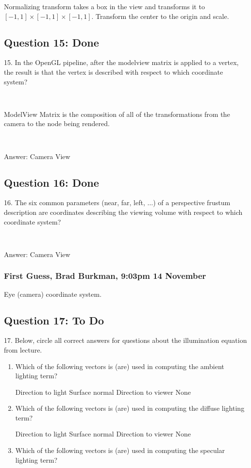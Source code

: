 \documentclass[11pt]{article}
\begin{document}
\begin{spacing}{1.2}
Normalizing transform takes a box in the view and transforms it to $[-1,1]\times [-1,1] \times [-1,1]$.  Transform the center to the origin and scale.  

\subsection{Question 15:  Done}
15.  In the OpenGL pipeline, after the modelview matrix is applied to a vertex, the result is that the vertex is described with respect to which coordinate system?

\

ModelView Matrix is the composition of all of the transformations from the camera to the
node being rendered.

\ 

Answer:  Camera View
\subsection{Question 16:  Done}
16.  The six common parameters (near, far, left, $\dots$) of a perspective frustum description are coordinates describing the viewing volume with respect to which coordinate system?

\

Answer:  Camera View

\subsubsection{First Guess, Brad Burkman, 9:03pm 14 November}

Eye (camera) coordinate system.

\subsection{Question 17:  To Do}
17.  Below, circle all correct answers for questions about the illumination equation from lecture.  

\begin{enumerate}[label=\arabic*)]
	\item Which of the following vectors is (are) used in computing the ambient lighting term?
	
	Direction to light \qquad Surface normal \qquad Direction to viewer \qquad None
	\item Which of the following vectors is (are) used in computing the diffuse lighting term?
	
	Direction to light \qquad Surface normal \qquad Direction to viewer \qquad None
	\item Which of the following vectors is (are) used in computing the specular lighting term?
		

\end{enumerate}
\end{spacing}
\end{document}
